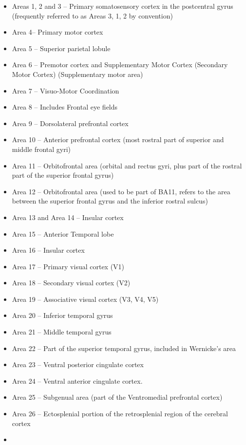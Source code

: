 \begin{itemize}
\tightlist
\item
  Areas 1, 2 and 3 -- Primary somatosensory cortex in the postcentral gyrus (frequently referred to as Areas 3, 1, 2 by convention)
\item
  Area 4-- Primary motor cortex
\item
  Area 5 -- Superior parietal lobule
\item
  Area 6 -- Premotor cortex and Supplementary Motor Cortex (Secondary Motor Cortex) (Supplementary motor area)
\item
  Area 7 -- Visuo-Motor Coordination
\item
  Area 8 -- Includes Frontal eye fields
\item
  Area 9 -- Dorsolateral prefrontal cortex
\item
  Area 10 -- Anterior prefrontal cortex (most rostral part of superior and middle frontal gyri)
\item
  Area 11 -- Orbitofrontal area (orbital and rectus gyri, plus part of the rostral part of the superior frontal gyrus)
\item
  Area 12 -- Orbitofrontal area (used to be part of BA11, refers to the area between the superior frontal gyrus and the inferior rostral sulcus)
\item
  Area 13 and Area 14 -- Insular cortex
\item
  Area 15 -- Anterior Temporal lobe
\item
  Area 16 -- Insular cortex
\item
  Area 17 -- Primary visual cortex (V1)
\item
  Area 18 -- Secondary visual cortex (V2)
\item
  Area 19 -- Associative visual cortex (V3, V4, V5)
\item
  Area 20 -- Inferior temporal gyrus
\item
  Area 21 -- Middle temporal gyrus
\item
  Area 22 -- Part of the superior temporal gyrus, included in Wernicke's area
\item
  Area 23 -- Ventral posterior cingulate cortex
\item
  Area 24 -- Ventral anterior cingulate cortex.
\item
  Area 25 -- Subgenual area (part of the Ventromedial prefrontal cortex)
\item
  Area 26 -- Ectosplenial portion of the retrosplenial region of the cerebral cortex
\item

\end{itemize}
